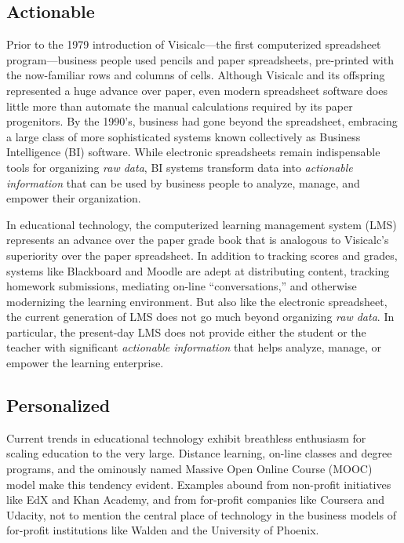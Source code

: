 \documentclass{article}
\begin{document}
\subsection{Actionable}
\label{sec:actionable}

Prior to the 1979 introduction of
Visicalc---the first computerized spreadsheet program---business people
used pencils and paper spreadsheets,
pre-printed with the now-familiar rows and columns of cells.
Although Visicalc and its offspring represented a huge advance over paper,
even modern spreadsheet software does little more than automate the manual
calculations required by its paper progenitors.
By the 1990's,
business had gone beyond the spreadsheet,
embracing a large class of more sophisticated
systems known collectively as Business Intelligence (BI) software.
While electronic spreadsheets remain indispensable tools for organizing \emph{raw data},
BI systems transform data into \emph{actionable information}
that can be used by business people
to analyze, manage, and empower their organization.

In educational technology,
the computerized learning management system (LMS)
represents an advance over the paper grade book
that is analogous to Visicalc's superiority over the paper spreadsheet.
In addition to tracking scores and grades,
systems like Blackboard and Moodle
are adept at distributing content,
tracking homework submissions,
mediating on-line ``conversations,''
and otherwise modernizing the learning environment.
But also like the electronic spreadsheet,
the current generation of LMS does not go much beyond organizing \emph{raw data}.
In particular, the present-day LMS does not provide either the student or the teacher
with significant \emph{actionable information} that helps
analyze, manage, or empower the learning enterprise.

\subsection{Personalized}
\label{sec:personalized}

Current trends in educational technology
exhibit breathless enthusiasm for scaling education
to the very large.
Distance learning,
on-line classes and degree programs,
and the ominously named Massive Open Online Course (MOOC) model
make this tendency evident.
Examples abound
from non-profit initiatives like EdX and Khan Academy,
and from for-profit companies like Coursera and Udacity,
not to mention the central place of technology in the business models of
for-profit institutions like Walden and the University of Phoenix.
\end{document}
